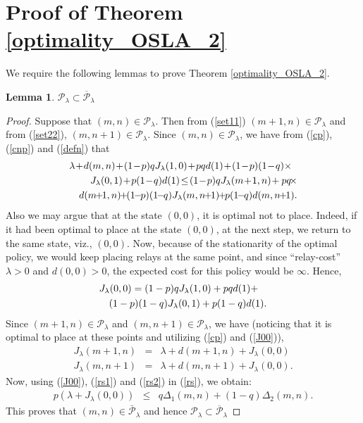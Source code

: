 \documentclass[conference]{IEEEtran}
\newtheorem{lemma}{Lemma}
\begin{document}
\section{Proof of Theorem \ref{optimality_OSLA_2}}
\label{optimality_OSLA_2_appendix}

We require the following lemmas to prove Theorem \ref{optimality_OSLA_2}.

\begin{lemma}
$\mathcal{P}_\lambda \subset \overline{\mathcal{P}}_{\lambda}$
\end{lemma}

\begin{proof}
Suppose that $(m,n)\in \mathcal{P}_\lambda$. 
Then from (\ref{set11}) $(m+1,n)\in \mathcal{P}_\lambda$ and from 
(\ref{set22}), $(m,n+1)\in \mathcal{P}_\lambda$. 
Since $(m,n)\in \mathcal{P}_\lambda$, we have from  (\ref{cp}), (\ref{cnp}) and (\ref{defn}) that 
\begin{eqnarray} 
\label{rs}
\lefteqn{\lambda\!+\!d(m,n)\!+\!(1\!-\!p)qJ_{\lambda}(1,0)\!+\!pqd(1)\!+\!(1\!-\!p)(1\!-\!q)\times} \nonumber\\
&&J_{\lambda}(0,1)\!+\!p(1\!-\!q)d(1)\!\leq\!
(1\!-\!p)qJ_{\lambda}(m\!+\!1,n)\!+pq\!\times\nonumber\\
&&d(m\!\!+\!\!1,n)\!\!+\!\!(1\!\!-\!\!p)(1\!\!-\!\!q)J_{\lambda}(m,n\!\!+\!\!1)\!\!+\!\!p(1\!\!-\!\!q)d(m,n\!\!+\!\!1).\nonumber\\
\end{eqnarray}
Also we may argue that at the state $(0,0)$, it is optimal not to place. Indeed, if it had been optimal to place at the state $(0,0)$, at the next step, we return to the same state, viz., $(0,0)$. Now, because of the stationarity of the optimal policy, we would keep placing relays at the same point, and since ``relay-cost'' $\lambda>0$ and $d(0,0)>0$, the expected cost for this policy would be $\infty$. Hence,
\begin{eqnarray}\label{J00} 
\lefteqn{J_{\lambda}(0,0)=(1-p)qJ_{\lambda}(1,0)+pqd(1)+} \nonumber \\
&&(1-p)(1-q)J_{\lambda}(0,1)+p(1-q)d(1).
\end{eqnarray} 
Since $(m+1,n)\in \mathcal{P}_\lambda$ and $(m,n+1)\in \mathcal{P}_\lambda$, we have (noticing that it is optimal to place at these points and utilizing (\ref{cp}) and (\ref{J00})),  
\begin{eqnarray} 
J_{\lambda}(m+1,n)&=&\lambda+d(m+1,n)+J_{\lambda}(0,0) \label{rs1}\\
J_{\lambda}(m,n+1)&=&\lambda+d(m,n+1)+J_{\lambda}(0,0)\label{rs2}.
\end{eqnarray}
Now, using (\ref{J00}), (\ref{rs1}) and (\ref{rs2}) in (\ref{rs}), we obtain:
\begin{eqnarray}
p(\lambda\!+\!J_{\lambda}(0,0))&\!\leq\!& q\Delta_1(m,n)\!+\!(1\!-\!q)\Delta_2(m,n).
\end{eqnarray}
This proves that 
$(m,n)\in \bar{\mathcal{P}}_\lambda$ and hence
$\mathcal{P}_\lambda\subset \overline{\mathcal{P}}_{\lambda}$
\end{proof}
\end{document}
